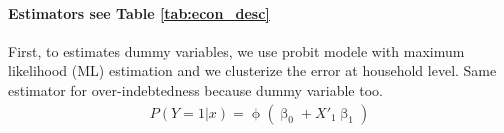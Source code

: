 \documentclass[a4paper, 11pt, onecolumn]{article}
\begin{document}


\paragraph{Estimators see Table \ref{tab:econ_desc}}


First, to estimates dummy variables, we use probit modele with maximum likelihood (ML) estimation and we clusterize the error at household level.
Same estimator for over-indebtedness because dummy variable too. 
\begin{equation}\label{eq:probit}
\begin{split}
P(Y=1|x)=\upphi(\upbeta_{0}+X'_{1}\upbeta_{1})
\end{split}
\end{equation}
\end{document}
